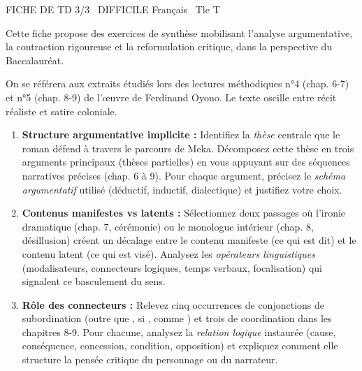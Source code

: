 \documentclass[11pt]{article}
\begin{document}
\begin{tcolorbox}[enhanced,colback=popink,colframe=popink,arc=10pt,boxrule=0pt,left=12pt,right=12pt,top=9pt,bottom=9pt]
{\color{white}\popxbold\small FICHE DE TD 3/3 \textbullet\ DIFFICILE \hfill Français \textbullet\ Tle T\par}
\end{tcolorbox}
\vspace{4pt}
Cette fiche propose des exercices de synthèse mobilisant l'analyse argumentative, la contraction rigoureuse et la reformulation critique, dans la perspective du Baccalauréat.

\begin{exercice}
On se référera aux extraits étudiés lors des lectures méthodiques n°4 (chap. 6-7) et n°5 (chap. 8-9) de l'œuvre de Ferdinand Oyono. Le texte oscille entre récit réaliste et satire coloniale.
\begin{enumerate}
    \item \textbf{Structure argumentative implicite :} Identifiez la \textit{thèse} centrale que le roman défend à travers le parcours de Meka. Décomposez cette thèse en trois arguments principaux (thèses partielles) en vous appuyant sur des séquences narratives précises (chap. 6 à 9). Pour chaque argument, précisez le \textit{schéma argumentatif} utilisé (déductif, inductif, dialectique) et justifiez votre choix.
    \item \textbf{Contenus manifestes vs latents :} Sélectionnez deux passages où l'ironie dramatique (chap. 7, cérémonie) ou le monologue intérieur (chap. 8, désillusion) créent un décalage entre le contenu manifeste (ce qui est dit) et le contenu latent (ce qui est visé). Analysez les \textit{opérateurs linguistiques} (modalisateurs, connecteurs logiques, temps verbaux, focalisation) qui signalent ce basculement du sens.
    \item \textbf{Rôle des connecteurs :} Relevez cinq occurrences de conjonctions de subordination (outre \og que \fg{}, \og si \fg{}, \og comme \fg{}) et trois de coordination dans les chapitres 8-9. Pour chacune, analysez la \textit{relation logique} instaurée (cause, conséquence, concession, condition, opposition) et expliquez comment elle structure la pensée critique du personnage ou du narrateur.
\end{enumerate}
\end{exercice}
\end{document}
